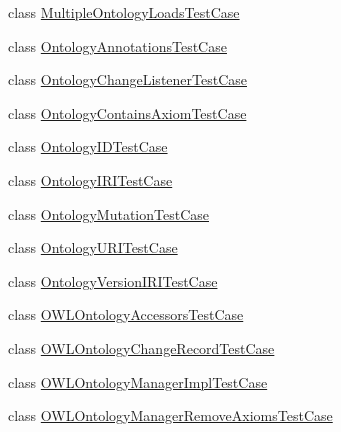 \begin{DoxyCompactItemize}
\item 
class \hyperlink{classorg_1_1semanticweb_1_1owlapi_1_1api_1_1test_1_1ontology_1_1_multiple_ontology_loads_test_case}{Multiple\-Ontology\-Loads\-Test\-Case}
\item 
class \hyperlink{classorg_1_1semanticweb_1_1owlapi_1_1api_1_1test_1_1ontology_1_1_ontology_annotations_test_case}{Ontology\-Annotations\-Test\-Case}
\item 
class \hyperlink{classorg_1_1semanticweb_1_1owlapi_1_1api_1_1test_1_1ontology_1_1_ontology_change_listener_test_case}{Ontology\-Change\-Listener\-Test\-Case}
\item 
class \hyperlink{classorg_1_1semanticweb_1_1owlapi_1_1api_1_1test_1_1ontology_1_1_ontology_contains_axiom_test_case}{Ontology\-Contains\-Axiom\-Test\-Case}
\item 
class \hyperlink{classorg_1_1semanticweb_1_1owlapi_1_1api_1_1test_1_1ontology_1_1_ontology_i_d_test_case}{Ontology\-I\-D\-Test\-Case}
\item 
class \hyperlink{classorg_1_1semanticweb_1_1owlapi_1_1api_1_1test_1_1ontology_1_1_ontology_i_r_i_test_case}{Ontology\-I\-R\-I\-Test\-Case}
\item 
class \hyperlink{classorg_1_1semanticweb_1_1owlapi_1_1api_1_1test_1_1ontology_1_1_ontology_mutation_test_case}{Ontology\-Mutation\-Test\-Case}
\item 
class \hyperlink{classorg_1_1semanticweb_1_1owlapi_1_1api_1_1test_1_1ontology_1_1_ontology_u_r_i_test_case}{Ontology\-U\-R\-I\-Test\-Case}
\item 
class \hyperlink{classorg_1_1semanticweb_1_1owlapi_1_1api_1_1test_1_1ontology_1_1_ontology_version_i_r_i_test_case}{Ontology\-Version\-I\-R\-I\-Test\-Case}
\item 
class \hyperlink{classorg_1_1semanticweb_1_1owlapi_1_1api_1_1test_1_1ontology_1_1_o_w_l_ontology_accessors_test_case}{O\-W\-L\-Ontology\-Accessors\-Test\-Case}
\item 
class \hyperlink{classorg_1_1semanticweb_1_1owlapi_1_1api_1_1test_1_1ontology_1_1_o_w_l_ontology_change_record_test_case}{O\-W\-L\-Ontology\-Change\-Record\-Test\-Case}
\item 
class \hyperlink{classorg_1_1semanticweb_1_1owlapi_1_1api_1_1test_1_1ontology_1_1_o_w_l_ontology_manager_impl_test_case}{O\-W\-L\-Ontology\-Manager\-Impl\-Test\-Case}
\item 
class \hyperlink{classorg_1_1semanticweb_1_1owlapi_1_1api_1_1test_1_1ontology_1_1_o_w_l_ontology_manager_remove_axioms_test_case}{O\-W\-L\-Ontology\-Manager\-Remove\-Axioms\-Test\-Case}

\end{DoxyCompactItemize}
